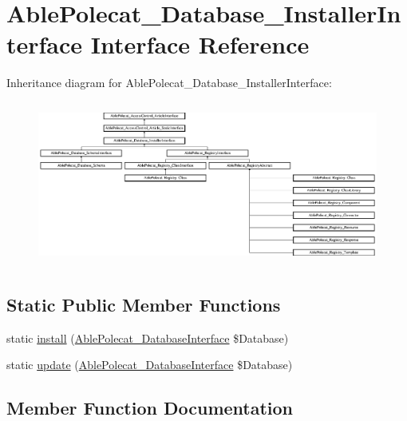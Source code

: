 \hypertarget{interface_able_polecat___database___installer_interface}{}\section{Able\+Polecat\+\_\+\+Database\+\_\+\+Installer\+Interface Interface Reference}
\label{interface_able_polecat___database___installer_interface}
Inheritance diagram for Able\+Polecat\+\_\+\+Database\+\_\+\+Installer\+Interface\+:\begin{figure}[H]
\begin{center}
\leavevmode
\includegraphics[height=5.419355cm]{interface_able_polecat___database___installer_interface}
\end{center}
\end{figure}
\subsection*{Static Public Member Functions}
\begin{DoxyCompactItemize}
\item 
static \hyperlink{interface_able_polecat___database___installer_interface_a97e9bacf538c072e0542eeb96d2475af}{install} (\hyperlink{interface_able_polecat___database_interface}{Able\+Polecat\+\_\+\+Database\+Interface} \$Database)
\item 
static \hyperlink{interface_able_polecat___database___installer_interface_a8398510e79e9787266fe116d6431948c}{update} (\hyperlink{interface_able_polecat___database_interface}{Able\+Polecat\+\_\+\+Database\+Interface} \$Database)
\end{DoxyCompactItemize}


\subsection{Member Function Documentation}
\hypertarget{interface_able_polecat___database___installer_interface_a97e9bacf538c072e0542eeb96d2475af}{}
